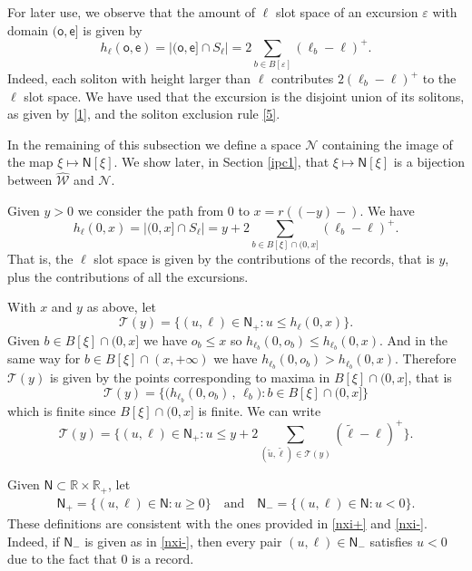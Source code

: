 \documentclass[12pt]{article}
\numberwithin{equation}{section}
\newcommand{\RR}{\mathbb R}
\newcommand{\cN}{\mathcal N}
\newcommand{\cW}{\mathcal W}
\newcommand{\sN}{\mathsf{N}}
\newcommand{\se}{{\mathsf{e}}}
\newcommand{\so}{{\mathsf{o}}}
\newcommand{\hcW}{\widehat{\cW}}
\newcommand{\tu}{\tilde u}
\newcommand{\eps}{\varepsilon}
\begin{document}
For later use, we observe that the amount of $\ell$ slot space of an excursion $\eps$ with domain $(\so,\se]$ is given by
\begin{equation}
h_\ell(\so,\se)=|(\so,\se]\cap S_\ell|=2\sum_{b\in B[\eps]}(\ell_b-\ell)^+.
\label{eqhelloe}
\end{equation}
Indeed, each soliton with height larger than $\ell$ contributes $2(\ell_b-\ell)^+$
to the $\ell$ slot space.
We have used that the excursion is the disjoint union of its solitons, as given by \eqref{1}, and the soliton exclusion rule \eqref{5}.

In the remaining of this subsection we define a space $\cN$ containing the image of the map $\xi\mapsto \sN[\xi]$. We show later, in Section \ref{ipc1}, that $\xi\mapsto \sN[\xi]$ is a bijection between $\hcW$ and $\cN$. 

Given $y>0$ we consider the path from 0 to $x=r((-y)-)$.
We have
\begin{equation}
h_\ell(0,x)=|(0,x]\cap S_\ell|=y+2\sum_{b\in B[\xi]\cap (0,x]}(\ell_b-\ell)^+.
\label{formulahell}
\end{equation}
That is, the $\ell$ slot space is given by the contributions of the records, that is $y$, plus the contributions of all the excursions.


With $x$ and $y$ as above, let
\begin{equation}
\mathcal T(y)= \{(u,\ell)\in \sN_+: u\leq h_\ell(0,x)\}.
\label{defRy}
\end{equation}
Given $b\in B[\xi]\cap (0,x]$ we have $o_b\leq x$ so
$h_{\ell_b}(0,o_b)\leq h_{\ell_b}(0,x)$.
And in the same way for $b\in B[\xi]\cap (x,+\infty)$ we have  
$h_{\ell_b}(0,o_b)> h_{\ell_b}(0,x)$.
Therefore $\mathcal T(y)$ is given by the points corresponding to maxima in $B[\xi]\cap (0,x]$, that is
\[
\mathcal T(y)= \bigl\{\bigl( h_{\ell_b}(0, o_b)\, , \, \ell_b\bigr) :b\in B[\xi]\cap (0,x] \bigr\}
\]
which is finite since $B[\xi]\cap (0,x]$ is finite.
We can write
\begin{equation}
\mathcal T(y)= \{(u,\ell)\in \sN_+: u\leq y+2\sum_{(\tu,\tilde \ell) \in \mathcal T(y)}(\tilde \ell-\ell)^+\}.
\label{eqRy}
\end{equation}


Given $\sN\subset\RR\times \RR_+$, let 
\begin{align}\label{n+n-}
\sN_+=\{(u,\ell)\in \sN: u\geq 0\}
\quad\text{and}\quad
\sN_-=\{(u,\ell)\in \sN: u< 0\}.
\end{align}
These definitions are consistent with the ones provided in \eqref{nxi+} and \eqref{nxi-}. Indeed, 
 if $\sN_-$ is given as in \eqref{nxi-}, then every pair $(u,\ell) \in \sN_-$ satisfies $u<0$ due to the fact that $0$ is a record.
\end{document}
